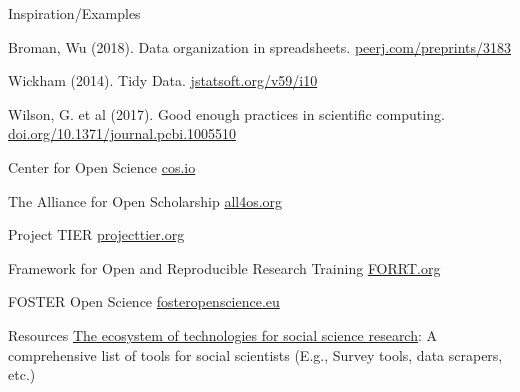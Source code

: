 \begin{block}{Inspiration/Examples}


Broman, Wu (2018). Data organization in spreadsheets. \href{https://peerj.com/preprints/3183/}{peerj.com/preprints/3183}

Wickham (2014). Tidy Data. \href{http://www.jstatsoft.org/v59/i10/}{jstatsoft.org/v59/i10}

Wilson, G. et al (2017). Good enough practices in scientific computing. \href{https://doi.org/10.1371/journal.pcbi.1005510}{doi.org/10.1371/journal.pcbi.1005510}


 Center for Open Science \href{https://www.cos.io/}{cos.io}
 
 The Alliance for Open Scholarship \href{https://www.all4os.org/}{all4os.org}
 
 Project TIER \href{https://www.projecttier.org/}{projecttier.org}
 
 Framework for Open and Reproducible Research Training \href{https://forrt.org/glossary/transparency/}{FORRT.org}

 FOSTER Open Science \href{https://www.fosteropenscience.eu/}{fosteropenscience.eu}

\end{block}

\begin{block}{Resources}
  \href{https://sagepublishing.github.io/sage_tools_social_science/}{The ecosystem of technologies for social science research}: A comprehensive list of tools for social scientists (E.g., Survey tools, data scrapers, etc.)

\end{block}